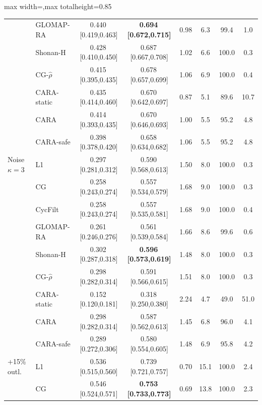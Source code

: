 \begin{table}[!htbp]
\begin{adjustbox}{max width=\textwidth,max totalheight=0.85\textheight}
\begin{tabular}{llcccccc}
 & GLOMAP-RA & 0.440\,{\scriptsize[0.419,0.463]} & \textbf{0.694\,{\scriptsize[0.672,0.715]}} & 0.98 & 6.3 & 99.4 & 1.0\\
 & Shonan-H & 0.428\,{\scriptsize[0.410,0.450]} & 0.687\,{\scriptsize[0.667,0.708]} & 1.02 & 6.6 & 100.0 & 0.3\\
 & CG-$\hat\rho$ & 0.415\,{\scriptsize[0.395,0.435]} & 0.678\,{\scriptsize[0.657,0.699]} & 1.06 & 6.9 & 100.0 & 0.4\\
 & CARA-static & 0.435\,{\scriptsize[0.414,0.460]} & 0.670\,{\scriptsize[0.642,0.697]} & 0.87 & 5.1 & 89.6 & 10.7\\
 & CARA & 0.414\,{\scriptsize[0.393,0.435]} & 0.670\,{\scriptsize[0.646,0.693]} & 1.00 & 5.5 & 95.2 & 4.8\\
 & CARA-safe & 0.398\,{\scriptsize[0.378,0.420]} & 0.658\,{\scriptsize[0.634,0.682]} & 1.06 & 5.5 & 95.2 & 4.8\\
\midrule
Noise $\kappa{=}3$ & L1 & 0.297\,{\scriptsize[0.281,0.312]} & 0.590\,{\scriptsize[0.568,0.613]} & 1.50 & 8.0 & 100.0 & 0.3\\
 & CG & 0.258\,{\scriptsize[0.243,0.274]} & 0.557\,{\scriptsize[0.534,0.579]} & 1.68 & 9.0 & 100.0 & 0.3\\
 & CycFilt & 0.258\,{\scriptsize[0.243,0.274]} & 0.557\,{\scriptsize[0.535,0.581]} & 1.68 & 9.0 & 100.0 & 0.4\\
 & GLOMAP-RA & 0.261\,{\scriptsize[0.246,0.276]} & 0.561\,{\scriptsize[0.539,0.584]} & 1.66 & 8.6 & 99.6 & 0.6\\
 & Shonan-H & 0.302\,{\scriptsize[0.287,0.318]} & \textbf{0.596\,{\scriptsize[0.573,0.619]}} & 1.48 & 8.0 & 100.0 & 0.3\\
 & CG-$\hat\rho$ & 0.298\,{\scriptsize[0.282,0.314]} & 0.591\,{\scriptsize[0.566,0.615]} & 1.51 & 8.0 & 100.0 & 0.3\\
 & CARA-static & 0.152\,{\scriptsize[0.120,0.181]} & 0.318\,{\scriptsize[0.250,0.380]} & 2.24 & 4.7 & 49.0 & 51.0\\
 & CARA & 0.298\,{\scriptsize[0.282,0.314]} & 0.587\,{\scriptsize[0.562,0.613]} & 1.45 & 6.8 & 96.0 & 4.1\\
 & CARA-safe & 0.289\,{\scriptsize[0.272,0.306]} & 0.580\,{\scriptsize[0.554,0.605]} & 1.48 & 6.9 & 95.8 & 4.2\\
\midrule
+15\% outl. & L1 & 0.536\,{\scriptsize[0.515,0.560]} & 0.739\,{\scriptsize[0.721,0.757]} & 0.70 & 15.1 & 100.0 & 2.4\\
 & CG & 0.546\,{\scriptsize[0.524,0.571]} & \textbf{0.753\,{\scriptsize[0.733,0.773]}} & 0.69 & 13.8 & 100.0 & 2.3\\

\end{tabular}
\end{adjustbox}
\end{table}
